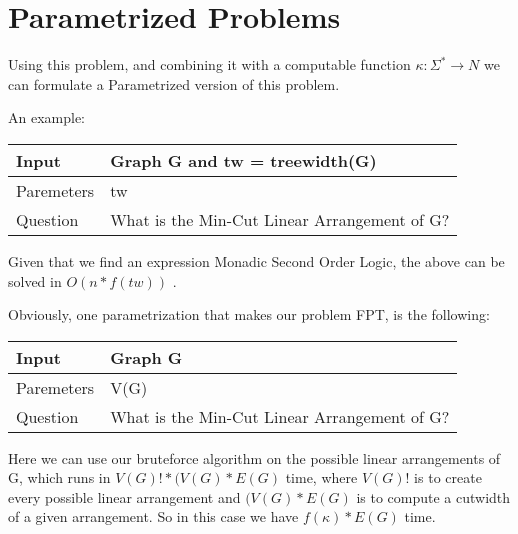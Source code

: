 \section{Parametrized Problems}

Using this problem, and combining it with a computable function $ \kappa : \Sigma^* \rightarrow N $ we can formulate a Parametrized version of this problem. 


An example:

\begin{center}
    \begin{tabular}{| l | p{5cm} |}
    \hline
    Input & Graph G and tw = treewidth(G)\\ \hline
    Paremeters & tw  \\ \hline
    Question & What is the Min-Cut Linear Arrangement of G?\\ \hline
    \end{tabular}
\end{center}

Given that we find an expression Monadic Second Order Logic, the above can be solved in $O(n*f(tw))$ \cite{trans}. 


Obviously, one parametrization that makes our problem FPT, is the following:



\begin{center}
    \begin{tabular}{| l | p{5cm} |}
    \hline
    Input & Graph G \\ \hline
    Paremeters & V(G)  \\ \hline
    Question & What is the Min-Cut Linear Arrangement of G?\\ \hline
    \end{tabular}
\end{center}

Here we can use our bruteforce algorithm on the possible linear arrangements of G, which runs in $V(G)!*(V(G)*E(G)$ time, 
where $V(G)!$ is to create every possible linear arrangement and $(V(G)*E(G)$ is to compute a cutwidth of a given arrangement.
So in this case we have $f(\kappa)*E(G)$ time. 
